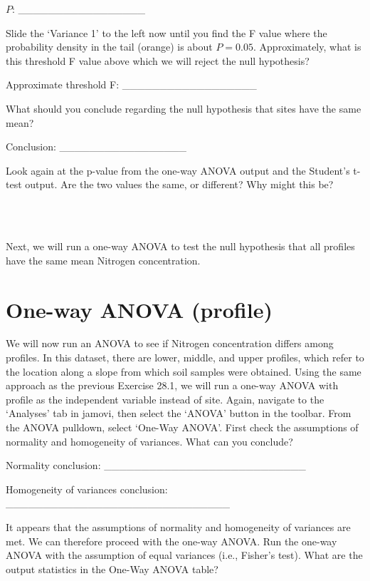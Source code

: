 \documentclass[
  openany]{scrbook}
\begin{document}
\(P\): \_\_\_\_\_\_\_\_\_\_\_\_\_\_\_\_\_

Slide the `Variance 1' to the left now until you find the F value where the probability density in the tail (orange) is about \(P = 0.05\).
Approximately, what is this threshold F value above which we will reject the null hypothesis?

Approximate threshold F: \_\_\_\_\_\_\_\_\_\_\_\_\_\_\_\_\_\_

What should you conclude regarding the null hypothesis that sites have the same mean?

Conclusion: \_\_\_\_\_\_\_\_\_\_\_\_\_\_\_\_\_

Look again at the p-value from the one-way ANOVA output and the Student's t-test output.
Are the two values the same, or different?
Why might this be?

\begin{verbatim}



\end{verbatim}

Next, we will run a one-way ANOVA to test the null hypothesis that all profiles have the same mean Nitrogen concentration.

\hypertarget{one-way-anova-profile}{%
\section{One-way ANOVA (profile)}\label{one-way-anova-profile}}

We will now run an ANOVA to see if Nitrogen concentration differs among profiles.
In this dataset, there are lower, middle, and upper profiles, which refer to the location along a slope from which soil samples were obtained.
Using the same approach as the previous Exercise 28.1, we will run a one-way ANOVA with profile as the independent variable instead of site.
Again, navigate to the `Analyses' tab in jamovi, then select the `ANOVA' button in the toolbar.
From the ANOVA pulldown, select `One-Way ANOVA'.
First check the assumptions of normality and homogeneity of variances.
What can you conclude?

Normality conclusion: \_\_\_\_\_\_\_\_\_\_\_\_\_\_\_\_\_\_\_\_\_\_\_\_\_\_\_

Homogeneity of variances conclusion: \_\_\_\_\_\_\_\_\_\_\_\_\_\_\_\_\_\_\_\_\_\_\_\_\_\_\_\_\_\_

It appears that the assumptions of normality and homogeneity of variances are met.
We can therefore proceed with the one-way ANOVA.
Run the one-way ANOVA with the assumption of equal variances (i.e., Fisher's test).
What are the output statistics in the One-Way ANOVA table?
\end{document}
